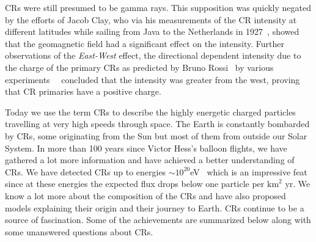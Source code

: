 \glspl{CR} were still presumed to be gamma rays. This supposition was quickly negated by the efforts of Jacob Clay, who via his measurements of the \gls{CR} intensity at different latitudes while sailing from Java to the Netherlands in 1927~\cite{Clay:1927I}, showed that the geomagnetic field had a significant effect on the intensity. Further observations of the \textit{East-West} effect, the directional dependent intensity due to the charge of the primary \glspl{CR} as predicted by Bruno Rossi~\cite{PhysRev.36.606} by various experiments~\cite{PhysRev.43.834}~\cite{PhysRev.43.835} concluded that the intensity was greater from the west, proving that \gls{CR} primaries have a positive charge.

Today we use the term \glspl{CR} to describe the highly energetic charged particles travelling at very high speeds through space. The Earth is constantly bombarded by \glspl{CR}, some originating from the Sun but most of them from outside our Solar System. In more than 100 years since Victor Hess's balloon flights, we have gathered a lot more information and have achieved a better understanding of \glspl{CR}. We have detected \glspl{CR} up to energies $\sim 10^{20}$\gls{eV}~\cite{TA_2023} which is an impressive feat since at these energies the expected flux drops below one particle per $\text{km}^2$ yr. We know a lot more about the composition of the \glspl{CR} and have also proposed models explaining their origin and their journey to Earth. \glspl{CR} continue to be a source of fascination. Some of the achievements are summarized below along with some unanswered questions about \glspl{CR}. 

